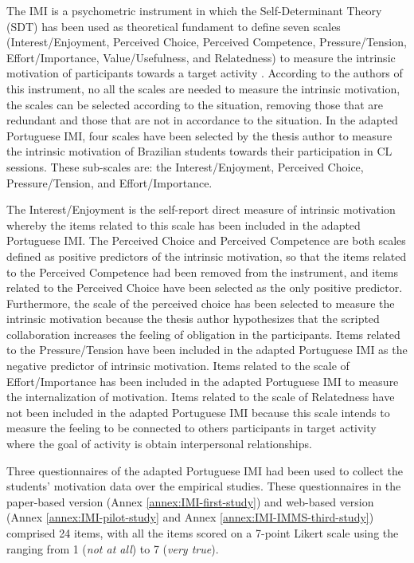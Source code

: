The IMI is a psychometric instrument in which the Self-Determinant Theory (SDT) has been used as theoretical fundament to define seven scales (Interest/Enjoyment, Perceived Choice, Perceived Competence, Pressure/Tension, Effort/Importance, Value/Usefulness, and Relatedness) to measure the intrinsic motivation of participants towards a target activity \cite{MonteiroMataPeixotoMonteiroMataPeixoto2015, RyanDeci2000}. According to the authors of this instrument, no all the scales are needed to measure the intrinsic motivation, the scales can be selected according to the situation, removing those that are redundant and those that are not in accordance to the situation. In the adapted Portuguese IMI, four scales have been selected by the thesis author to measure the intrinsic motivation of Brazilian students towards their participation in CL sessions. These sub-scales are: the Interest/Enjoyment, Perceived Choice, Pressure/Tension, and Effort/Importance.

The Interest/Enjoyment is the self-report direct measure of intrinsic motivation whereby the items related to this scale has been included in the adapted Portuguese IMI. The Perceived Choice and Perceived Competence are both scales defined as positive predictors of the intrinsic motivation, so that the items related to the Perceived Competence had been removed from the instrument, and items related to the Perceived Choice have been selected as the only positive predictor. Furthermore, the scale of the perceived choice has been selected to measure the intrinsic motivation because the thesis author hypothesizes that the scripted collaboration increases the feeling of obligation in the participants. Items related to the Pressure/Tension have been included in the adapted Portuguese IMI as the negative predictor of intrinsic motivation. Items related to the scale of Effort/Importance has been included in the adapted Portuguese IMI to measure the internalization of motivation. Items related to the scale of Relatedness have not been included in the adapted Portuguese IMI because this scale intends to measure the feeling to be connected to others participants in target activity where the goal of activity is obtain interpersonal relationships.

Three questionnaires of the adapted Portuguese IMI had been used to collect the students' motivation data over the empirical studies. These questionnaires in the paper-based version (Annex \ref{annex:IMI-first-study}) and web-based version (Annex \ref{annex:IMI-pilot-study} and Annex \ref{annex:IMI-IMMS-third-study}) comprised 24 items, with all the items scored on a 7-point Likert scale using the ranging from 1 (\emph{not at all}) to 7 (\emph{very true}).

